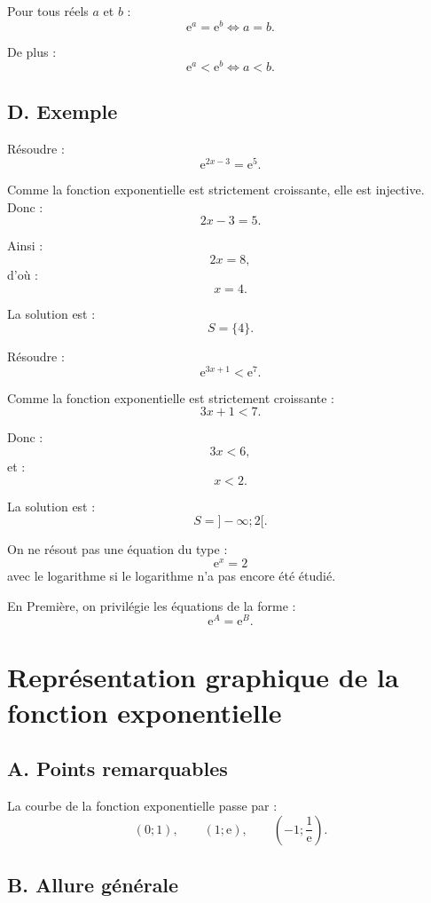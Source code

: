 \documentclass[11pt,a4paper]{article}
\newcommand{\e}{\mathrm{e}}
\begin{document}
\begin{propriete}
Pour tous réels $a$ et $b$ :
\[
\e^a=\e^b \Longleftrightarrow a=b.
\]

De plus :
\[
\e^a<\e^b \Longleftrightarrow a<b.
\]
\end{propriete}

\subsection*{D. Exemple}

\begin{exemplebox}
Résoudre :
\[
\e^{2x-3}=\e^{5}.
\]

Comme la fonction exponentielle est strictement croissante, elle est injective. Donc :
\[
2x-3=5.
\]

Ainsi :
\[
2x=8,
\]
d'où :
\[
x=4.
\]

La solution est :
\[
S=\{4\}.
\]
\end{exemplebox}

\begin{exemplebox}
Résoudre :
\[
\e^{3x+1}<\e^{7}.
\]

Comme la fonction exponentielle est strictement croissante :
\[
3x+1<7.
\]

Donc :
\[
3x<6,
\]
et :
\[
x<2.
\]

La solution est :
\[
S=]-\infty;2[.
\]
\end{exemplebox}

\begin{erreur}
On ne résout pas une équation du type :
\[
\e^x=2
\]
avec le logarithme si le logarithme n'a pas encore été étudié.

En Première, on privilégie les équations de la forme :
\[
\e^A=\e^B.
\]
\end{erreur}

\section{Représentation graphique de la fonction exponentielle}

\subsection*{A. Points remarquables}

La courbe de la fonction exponentielle passe par :
\[
(0;1),
\qquad
(1;\e),
\qquad
(-1;\frac{1}{\e}).
\]

\subsection*{B. Allure générale}
\end{document}
